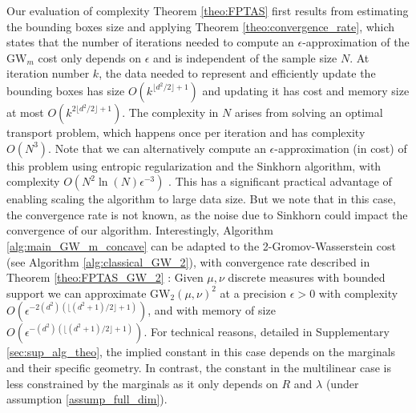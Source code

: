 \documentclass{article}
\newcommand{\1}{\mathbf{1}}
\newcommand{\GW}{\mathrm{GW}}
\theoremstyle{definition}
\theoremstyle{remark}
\begin{document}
Our evaluation of complexity Theorem \ref{theo:FPTAS} first results from estimating  the bounding boxes size and applying Theorem \ref{theo:convergence_rate}, which states that the number of iterations needed to compute an $\epsilon$-approximation of the $\GW_m$ cost only depends on $\epsilon$ and is independent of the sample size $N$. At iteration number $k$, the data needed to represent and efficiently update the bounding boxes has size $O(k^{\lfloor d^2/2\rfloor+1})$ and updating it has cost and memory size at most  $O(k^{2\lfloor d^2/2\rfloor+1})$.  The complexity in $N$ arises from solving an optimal transport problem, which happens once per iteration and  has complexity $O(N^3)$.  Note that we can alternatively compute an $\epsilon$-approximation (in cost) of this problem using entropic regularization and the Sinkhorn algorithm, with complexity $O(N^2\ln(N)\epsilon^{-3})$ \cite[Remark 4.6]{peyre2019computational}. This has a significant practical advantage of enabling scaling the algorithm to large data size. But we note that in this case, the convergence rate is not known, as the noise due to Sinkhorn could impact the convergence of our algorithm. Interestingly, Algorithm \ref{alg:main_GW_m_concave} can be adapted to the 2-Gromov-Wasserstein cost (see Algorithm \ref{alg:classical_GW_2}), with convergence rate described in Theorem \ref{theo:FPTAS_GW_2} : Given $\mu,\nu$ discrete measures with bounded support we can approximate $\GW_2(\mu,\nu)^2$ at a precision $\epsilon>0$ with complexity $O(\epsilon^{-2(d^2)(\lfloor (d^2+1)/2\rfloor+1)})$, and with  memory of size $O(\epsilon^{-(d^2)(\lfloor (d^2+1)/2\rfloor+1)})$.
For technical reasons, detailed in Supplementary \ref{sec:sup_alg_theo}, the implied constant in this case depends on the marginals and their specific geometry. In contrast, the constant in the multilinear case is less constrained by the marginals as it only depends on $R$ and $\lambda$ (under assumption \ref{assump_full_dim}). 
\end{document}
